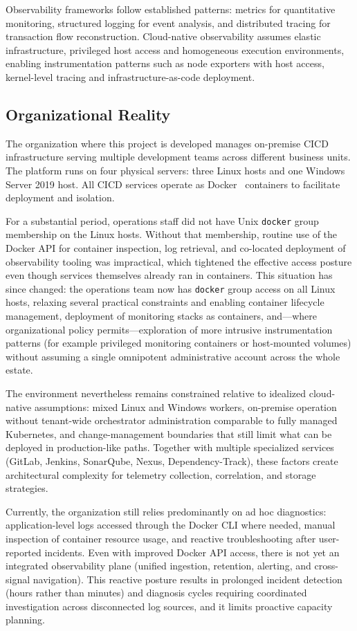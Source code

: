 Observability frameworks follow established patterns: metrics for quantitative monitoring, structured logging for event analysis, and distributed tracing for transaction flow reconstruction. Cloud-native observability assumes elastic infrastructure, privileged host access and homogeneous execution environments, enabling instrumentation patterns such as node exporters with host access, kernel-level tracing and infrastructure-as-code deployment.

\subsection{Organizational Reality}
The organization where this project is developed manages on-premise \ac{CICD} infrastructure serving multiple development teams across different business units. The platform runs on four physical servers: three Linux hosts and one Windows Server 2019 host. All \ac{CICD} services operate as Docker~\cite{docker2014} containers to facilitate deployment and isolation.

For a substantial period, operations staff did not have Unix \texttt{docker} group membership on the Linux hosts. Without that membership, routine use of the Docker API for container inspection, log retrieval, and co-located deployment of observability tooling was impractical, which tightened the effective access posture even though services themselves already ran in containers. This situation has since changed: the operations team now has \texttt{docker} group access on all Linux hosts, relaxing several practical constraints and enabling container lifecycle management, deployment of monitoring stacks as containers, and---where organizational policy permits---exploration of more intrusive instrumentation patterns (for example privileged monitoring containers or host-mounted volumes) without assuming a single omnipotent administrative account across the whole estate.

The environment nevertheless remains constrained relative to idealized cloud-native assumptions: mixed Linux and Windows workers, on-premise operation without tenant-wide orchestrator administration comparable to fully managed Kubernetes, and change-management boundaries that still limit what can be deployed in production-like paths. Together with multiple specialized services (GitLab, Jenkins, SonarQube, Nexus, Dependency-Track), these factors create architectural complexity for telemetry collection, correlation, and storage strategies.

Currently, the organization still relies predominantly on ad hoc diagnostics: application-level logs accessed through the Docker CLI where needed, manual inspection of container resource usage, and reactive troubleshooting after user-reported incidents. Even with improved Docker API access, there is not yet an integrated observability plane (unified ingestion, retention, alerting, and cross-signal navigation). This reactive posture results in prolonged incident detection (hours rather than minutes) and diagnosis cycles requiring coordinated investigation across disconnected log sources, and it limits proactive capacity planning.

